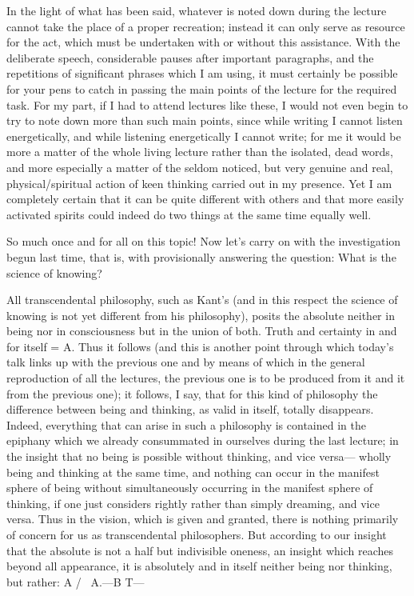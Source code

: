 In the light of what has been said,
whatever is noted down during the lecture
cannot take the place of a proper recreation;
instead it can only serve as resource for the act,
which must be undertaken with or without this assistance.
With the deliberate speech, considerable pauses after important
paragraphs, and the repetitions of significant phrases
which I am using, it must certainly be possible for
your pens to catch in passing the main points of the
lecture for the required task.
For my part, if I had to attend lectures like these,
I would not even begin to try to note down more than such main points,
since while writing I cannot listen energetically,
and while listening energetically I cannot write;
for me it would be more a matter of the whole living lecture rather than
the isolated, dead words, and more especially a matter of
the seldom noticed, but very genuine and real,
physical/spiritual action of keen thinking carried out in my presence.
Yet I am completely certain that it can be quite different with others
and that more easily activated spirits could indeed do
two things at the same time equally well.

So much once and for all on this topic!
Now let's carry on with the investigation begun last time,
that is, with provisionally answering the question:
What is the science of knowing?

All transcendental philosophy, such as Kant's
(and in this respect the science of knowing is not
yet different from his philosophy),
posits the absolute neither in being nor in consciousness
but in the union of both.
Truth and certainty in and for itself = A.
Thus it follows (and this is another point
through which today's talk links up with the previous one and
by means of which in the general reproduction of all the lectures,
the previous one is to be produced from it and it from the previous one);
it follows, I say, that for this kind of philosophy
the difference between being and thinking,
as valid in itself, totally disappears.
Indeed, everything that can arise in such a philosophy is
contained in the epiphany which we already consummated in ourselves
during the last lecture;
in the insight that no being is possible without thinking, and vice versa—
wholly being and thinking at the same time, and
nothing can occur in the manifest sphere of being
without simultaneously occurring in the manifest sphere of thinking,
if one just considers rightly rather than simply dreaming, and vice versa.
Thus in the vision, which is given and granted,
there is nothing primarily of concern for us as transcendental philosophers.
But according to our insight that the absolute is
not a half but indivisible oneness,
an insight which reaches beyond all appearance,
it is absolutely and in itself neither being nor thinking, but rather:
A
/ \
A.—B T—

